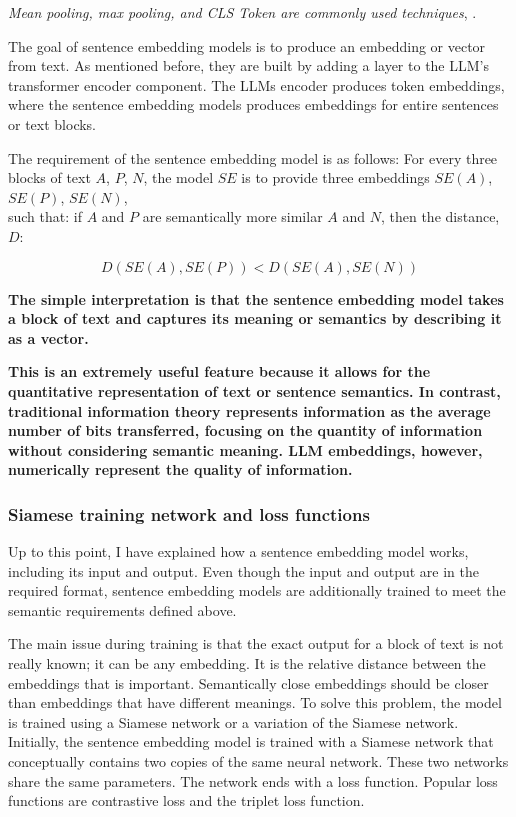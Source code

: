 \documentclass{wseas}
\begin{document}
\textit{Mean pooling, max pooling, and CLS Token are commonly used techniques}, \cite{sbert}.

The goal of sentence embedding models is to produce an embedding or
vector from text. As mentioned before, they are built by adding a layer
to the LLM's transformer encoder component. The LLMs encoder produces token
embeddings, where the sentence embedding models produces embeddings for
entire sentences or text blocks.

The requirement of the sentence embedding model is as follows:
For every three blocks of text \(A\), \(P\), \(N\), the model \(SE\) is
to provide three embeddings \(SE(A)\), \(SE(P)\), \(SE(N)\),\\
such that: if \(A\) and \(P\) are semantically more similar \(A\) and
\(N\), then the distance, $D$: 

\begin{equation}
  D(SE(A), SE(P)) < D(SE(A), SE(N))
\end{equation}

\textbf{The simple interpretation is that the sentence embedding model
takes a block of text and captures its meaning or semantics by
describing it as a vector.}

\textbf{This is an extremely useful feature because it allows for the 
quantitative representation of text or sentence semantics. In contrast, 
traditional information theory represents information as the 
average number of bits transferred, focusing on the quantity of information 
without considering semantic meaning. LLM embeddings, however, numerically 
represent the quality of information.}

\subsubsection{Siamese training network and loss functions}

Up to this point, I have explained how a sentence embedding model works,
including its input and output. Even though the input and output are in
the required format, sentence embedding models are additionally trained
to meet the semantic requirements defined above.

The main issue during training is that the exact output for a block of
text is not really known; it can be any embedding. It is the relative 
distance between the embeddings that is important. Semantically close 
embeddings should be closer than embeddings that have different meanings. 
To solve this problem, the model is trained using a Siamese network or a
variation of the Siamese network. Initially, the sentence embedding model is
trained with a Siamese network that conceptually contains two copies of
the same neural network. These two networks share the same parameters.
The network ends with a loss function. Popular loss functions are
contrastive loss and the triplet loss function.
\end{document}
